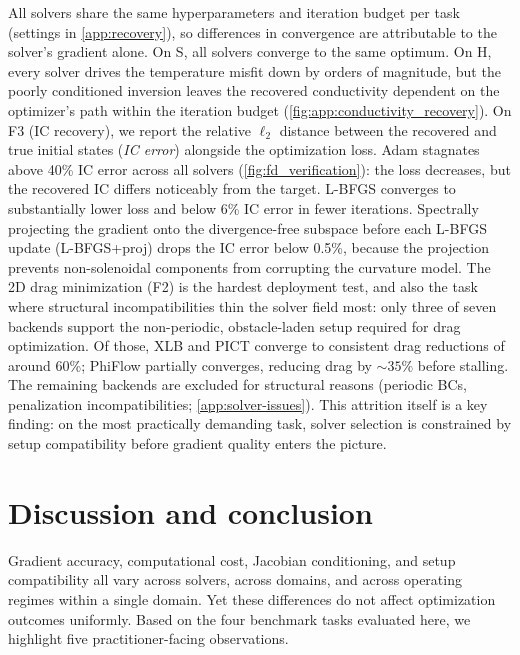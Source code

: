 \documentclass[11pt,a4paper]{article}
\begin{document}
All solvers share the same hyperparameters and iteration budget per
task (settings in \cref{app:recovery}), so differences in convergence
are attributable to the solver's gradient alone.
On S, all solvers converge to the same optimum. On H, every solver
drives the temperature misfit down by orders of magnitude, but the poorly
conditioned inversion leaves the recovered conductivity dependent on the
optimizer's path within the iteration budget
(\cref{fig:app:conductivity_recovery}).
On F3 (IC recovery), we report the relative $\ell_2$ distance between
the recovered and true initial states (\textit{IC error})
alongside the optimization loss. Adam stagnates
above 40\% IC error across all solvers (\cref{fig:fd_verification}):
the loss decreases, but the recovered IC differs noticeably from the
target.
L-BFGS converges to substantially lower loss and below 6\% IC error in
fewer iterations.
Spectrally projecting the gradient onto the divergence-free subspace
before each L-BFGS update (L-BFGS+proj) drops the IC error below 0.5\%,
because the projection prevents non-solenoidal components from
corrupting the curvature model.
The 2D drag minimization (F2) is the hardest deployment test, and
also the task where structural incompatibilities thin the solver field
most: only three of seven backends support the non-periodic, obstacle-laden
setup required for drag optimization.
Of those, XLB and PICT converge to consistent drag reductions of
around 60\%; PhiFlow partially converges, reducing drag by ${\sim}35\%$
before stalling. The remaining backends are excluded for structural
reasons (periodic BCs, penalization incompatibilities;
\cref{app:solver-issues}). This attrition itself is a key finding:
on the most practically demanding task, solver selection is constrained
by setup compatibility before gradient quality enters the picture.

\section{Discussion and conclusion}
\label{sec:conclusion}

Gradient accuracy, computational cost, Jacobian conditioning, and setup
compatibility all vary across solvers, across domains, and across
operating regimes within a single domain. Yet these differences do not
affect optimization outcomes uniformly. Based on the four benchmark
tasks evaluated here, we highlight five practitioner-facing observations.
\end{document}

